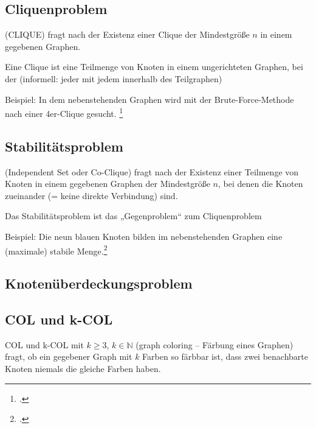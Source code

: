 \documentclass{lehramt-informatik-haupt}
\begin{document}
%

\subsection{Cliquenproblem}

(CLIQUE) fragt nach der Existenz einer Clique der Mindestgröße $n$ in
einem gegebenen Graphen.

Eine Clique ist eine Teilmenge von Knoten in einem ungerichteten
Graphen, bei der 
(informell: jeder mit jedem innerhalb des Teilgraphen)

Beispiel: In dem nebenstehenden Graphen wird mit der Brute-Force-Methode
nach einer 4er-Clique gesucht.
\footcite[Seite 76]{theo:fs:4}

%

\subsection{Stabilitätsproblem}

(Independent Set oder Co-Clique) fragt nach der Existenz einer Teilmenge
von Knoten in einem gegebenen Graphen der Mindestgröße $n$, bei denen
die Knoten zueinander  (= keine direkte
Verbindung) sind.

Das Stabilitätsproblem ist das „Gegenproblem“ zum Cliquenproblem

Beispiel: Die neun blauen Knoten bilden im nebenstehenden Graphen eine
(maximale) stabile Menge.\footcite[Seite 77]{theo:fs:4}

%

\subsection{Knotenüberdeckungsproblem}

\liProblemVertexCover

%

\subsection{COL und k-COL}

COL und k-COL mit $k \geq 3$, $k \in \mathbb{N}$ (graph coloring –
Färbung eines Graphen) fragt, ob ein gegebener Graph mit $k$ Farben so
färbbar ist, dass zwei benachbarte Knoten niemals die gleiche Farben
haben.

\literatur
\end{document}
